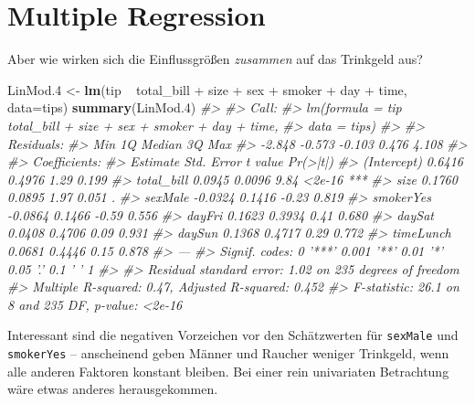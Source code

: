 \documentclass[12pt,]{book}
\newenvironment{Shaded}{\begin{snugshade}}{\end{snugshade}}
\newcommand{\KeywordTok}[1]{\textcolor[rgb]{0.13,0.29,0.53}{\textbf{{#1}}}}
\newcommand{\DataTypeTok}[1]{\textcolor[rgb]{0.13,0.29,0.53}{{#1}}}
\newcommand{\FloatTok}[1]{\textcolor[rgb]{0.00,0.00,0.81}{{#1}}}
\newcommand{\StringTok}[1]{\textcolor[rgb]{0.31,0.60,0.02}{{#1}}}
\newcommand{\CommentTok}[1]{\textcolor[rgb]{0.56,0.35,0.01}{\textit{{#1}}}}
\newcommand{\NormalTok}[1]{{#1}}
\begin{document}
\section{Multiple Regression}\label{multiple-regression}

Aber wie wirken sich die Einflussgrößen \emph{zusammen} auf das
Trinkgeld aus?

\begin{Shaded}
\begin{Highlighting}[]
\NormalTok{LinMod}\FloatTok{.4} \NormalTok{<-}\StringTok{ }\KeywordTok{lm}\NormalTok{(tip ~}\StringTok{ }\NormalTok{total_bill +}\StringTok{ }\NormalTok{size +}\StringTok{ }\NormalTok{sex  +}\StringTok{ }\NormalTok{smoker +}\StringTok{ }\NormalTok{day +}\StringTok{ }\NormalTok{time, }\DataTypeTok{data=}\NormalTok{tips)}
\KeywordTok{summary}\NormalTok{(LinMod}\FloatTok{.4}\NormalTok{)}
\CommentTok{#> }
\CommentTok{#> Call:}
\CommentTok{#> lm(formula = tip ~ total_bill + size + sex + smoker + day + time, }
\CommentTok{#>     data = tips)}
\CommentTok{#> }
\CommentTok{#> Residuals:}
\CommentTok{#>    Min     1Q Median     3Q    Max }
\CommentTok{#> -2.848 -0.573 -0.103  0.476  4.108 }
\CommentTok{#> }
\CommentTok{#> Coefficients:}
\CommentTok{#>             Estimate Std. Error t value Pr(>|t|)    }
\CommentTok{#> (Intercept)   0.6416     0.4976    1.29    0.199    }
\CommentTok{#> total_bill    0.0945     0.0096    9.84   <2e-16 ***}
\CommentTok{#> size          0.1760     0.0895    1.97    0.051 .  }
\CommentTok{#> sexMale      -0.0324     0.1416   -0.23    0.819    }
\CommentTok{#> smokerYes    -0.0864     0.1466   -0.59    0.556    }
\CommentTok{#> dayFri        0.1623     0.3934    0.41    0.680    }
\CommentTok{#> daySat        0.0408     0.4706    0.09    0.931    }
\CommentTok{#> daySun        0.1368     0.4717    0.29    0.772    }
\CommentTok{#> timeLunch     0.0681     0.4446    0.15    0.878    }
\CommentTok{#> ---}
\CommentTok{#> Signif. codes:  0 '***' 0.001 '**' 0.01 '*' 0.05 '.' 0.1 ' ' 1}
\CommentTok{#> }
\CommentTok{#> Residual standard error: 1.02 on 235 degrees of freedom}
\CommentTok{#> Multiple R-squared:  0.47,   Adjusted R-squared:  0.452 }
\CommentTok{#> F-statistic: 26.1 on 8 and 235 DF,  p-value: <2e-16}
\end{Highlighting}
\end{Shaded}

Interessant sind die negativen Vorzeichen vor den Schätzwerten für
\texttt{sexMale} und \texttt{smokerYes} -- anscheinend geben Männer und
Raucher weniger Trinkgeld, wenn alle anderen Faktoren konstant bleiben.
Bei einer rein univariaten Betrachtung wäre etwas anderes
herausgekommen.
\end{document}
